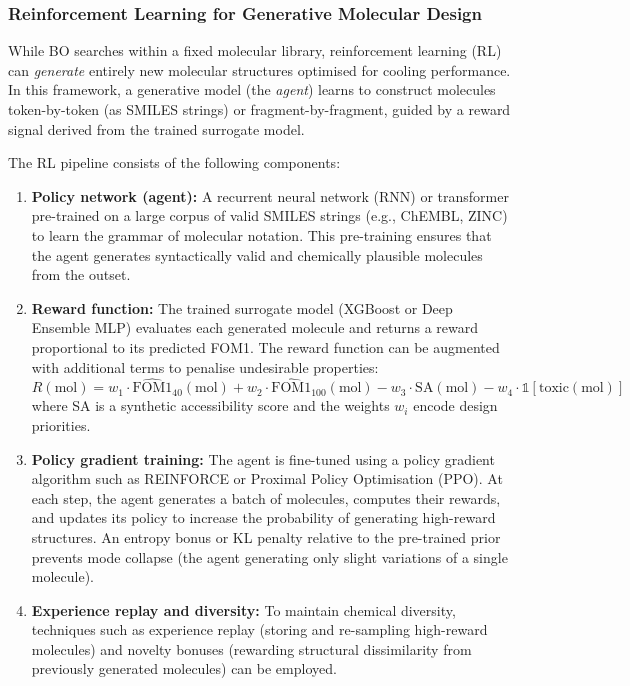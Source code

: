 \documentclass[11pt,a4paper]{article}
\begin{document}
\subsubsection{Reinforcement Learning for Generative Molecular Design}

While BO searches within a fixed molecular library, reinforcement learning (RL) can \emph{generate} entirely new molecular structures optimised for cooling performance. In this framework, a generative model (the \emph{agent}) learns to construct molecules token-by-token (as SMILES strings) or fragment-by-fragment, guided by a reward signal derived from the trained surrogate model.

The RL pipeline consists of the following components:
\begin{enumerate}
    \item \textbf{Policy network (agent):} A recurrent neural network (RNN) or transformer pre-trained on a large corpus of valid SMILES strings (e.g., ChEMBL, ZINC) to learn the grammar of molecular notation. This pre-training ensures that the agent generates syntactically valid and chemically plausible molecules from the outset.

    \item \textbf{Reward function:} The trained surrogate model (XGBoost or Deep Ensemble MLP) evaluates each generated molecule and returns a reward proportional to its predicted FOM1. The reward function can be augmented with additional terms to penalise undesirable properties:
    \begin{equation}
        R(\text{mol}) = w_1 \cdot \widehat{\text{FOM1}}_{40}(\text{mol}) + w_2 \cdot \widehat{\text{FOM1}}_{100}(\text{mol}) - w_3 \cdot \text{SA}(\text{mol}) - w_4 \cdot \mathbb{1}[\text{toxic}(\text{mol})]
    \end{equation}
    where SA is a synthetic accessibility score and the weights $w_i$ encode design priorities.

    \item \textbf{Policy gradient training:} The agent is fine-tuned using a policy gradient algorithm such as REINFORCE or Proximal Policy Optimisation (PPO). At each step, the agent generates a batch of molecules, computes their rewards, and updates its policy to increase the probability of generating high-reward structures. An entropy bonus or KL penalty relative to the pre-trained prior prevents mode collapse (the agent generating only slight variations of a single molecule).

    \item \textbf{Experience replay and diversity:} To maintain chemical diversity, techniques such as experience replay (storing and re-sampling high-reward molecules) and novelty bonuses (rewarding structural dissimilarity from previously generated molecules) can be employed.
\end{enumerate}
\end{document}
